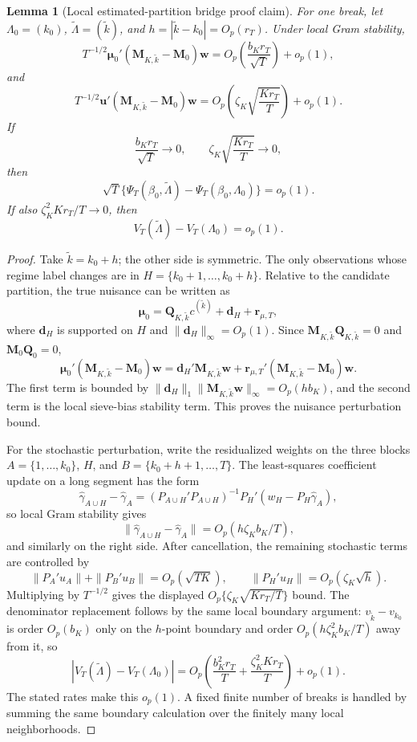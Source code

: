 \documentclass[12pt]{article}
\numberwithin{equation}{section}
\newtheorem{lemma}{Lemma}
\theoremstyle{definition}
\newcommand{\op}{o_p}
\newcommand{\Op}{O_p}
\begin{document}
\begin{lemma}[Local estimated-partition bridge proof claim]
\label{lem:part2-local-bridge-proof-claim}
For one break, let \(\Lambda_0=(k_0)\), \(\widetilde\Lambda=(\widetilde k)\),
and \(h=|\widetilde k-k_0|=\Op(r_T)\). Under local Gram stability,
\[
    T^{-1/2}\bm\mu_0'(\bm M_{K,\widetilde k}-\bm M_0)\bm w
    =\Op\!\left(\frac{b_Kr_T}{\sqrt T}\right)+\op(1),
\]
and
\[
    T^{-1/2}\bm u'(\bm M_{K,\widetilde k}-\bm M_0)\bm w
    =\Op\!\left(\zeta_K\sqrt{\frac{Kr_T}{T}}\right)+\op(1).
\]
If
\[
    \frac{b_Kr_T}{\sqrt T}\to0,
    \qquad
    \zeta_K\sqrt{\frac{Kr_T}{T}}\to0,
\]
then
\[
    \sqrt T\{\Psi_T(\beta_0,\widetilde\Lambda)
    -\Psi_T(\beta_0,\Lambda_0)\}=\op(1).
\]
If also \(\zeta_K^2Kr_T/T\to0\), then
\[
    V_T(\widetilde\Lambda)-V_T(\Lambda_0)=\op(1).
\]
\end{lemma}

\begin{proof}
Take \(\widetilde k=k_0+h\); the other side is symmetric. The only observations
whose regime label changes are in \(H=\{k_0+1,\ldots,k_0+h\}\). Relative to the
candidate partition, the true nuisance can be written as
\[
    \bm\mu_0=\bm Q_{K,\widetilde k}c^{(\widetilde k)}
      +\bm d_H+\bm r_{\mu,T},
\]
where \(\bm d_H\) is supported on \(H\) and \(\|\bm d_H\|_\infty=\Op(1)\). Since
\(\bm M_{K,\widetilde k}\bm Q_{K,\widetilde k}=0\) and
\(\bm M_0\bm Q_0=0\),
\[
    \bm\mu_0'(\bm M_{K,\widetilde k}-\bm M_0)\bm w
    =\bm d_H'\bm M_{K,\widetilde k}\bm w
      +\bm r_{\mu,T}'(\bm M_{K,\widetilde k}-\bm M_0)\bm w.
\]
The first term is bounded by \(\|\bm d_H\|_1\|\bm M_{K,\widetilde k}\bm w\|_\infty
=\Op(hb_K)\), and the second term is the local sieve-bias stability term.
This proves the nuisance perturbation bound.

For the stochastic perturbation, write the residualized weights on the three
blocks \(A=\{1,\ldots,k_0\}\), \(H\), and \(B=\{k_0+h+1,\ldots,T\}\). The
least-squares coefficient update on a long segment has the form
\[
    \widehat\gamma_{A\cup H}-\widehat\gamma_A
    =(P_{A\cup H}'P_{A\cup H})^{-1}
      P_H'(w_H-P_H\widehat\gamma_A),
\]
so local Gram stability gives
\[
    \|\widehat\gamma_{A\cup H}-\widehat\gamma_A\|
    =\Op(h\zeta_Kb_K/T),
\]
and similarly on the right side. After cancellation, the remaining stochastic
terms are controlled by
\[
    \|P_A'u_A\|+\|P_B'u_B\|=\Op(\sqrt{TK}),
    \qquad
    \|P_H'u_H\|=\Op(\zeta_K\sqrt h).
\]
Multiplying by \(T^{-1/2}\) gives the displayed
\(\Op\{\zeta_K\sqrt{Kr_T/T}\}\) bound. The denominator replacement follows by
the same local boundary argument: \(v_{\widetilde k}-v_{k_0}\) is order
\(\Op(b_K)\) only on the \(h\)-point boundary and order
\(\Op(h\zeta_K^2b_K/T)\) away from it, so
\[
    |V_T(\widetilde\Lambda)-V_T(\Lambda_0)|
    =\Op\!\left(\frac{b_K^2r_T}{T}
      +\frac{\zeta_K^2Kr_T}{T}\right)+\op(1).
\]
The stated rates make this \(\op(1)\). A fixed finite number of breaks is
handled by summing the same boundary calculation over the finitely many local
neighborhoods.
\end{proof}
\end{document}
